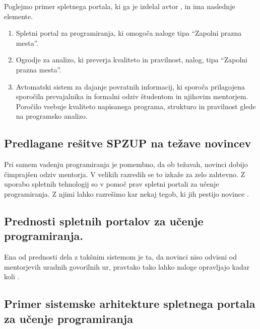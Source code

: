 
Poglejmo primer spletnega portala, ki ga je izdelal avtor
\cite{thesisAWebP}, in ima naslednje elemente.

\begin{enumerate}
\def\labelenumi{\arabic{enumi}.}
\item
  Spletni portal za programiranja, ki omogoča naloge tipa ``Zapolni
  prazna mesta''.
\item
  Ogrodje za analizo, ki preverja kvaliteto in pravilnost, nalog, tipa
  ``Zapolni prazna mesta''.
\item
  Avtomatski sistem za dajanje povratnih informacij, ki sporoča
  prilagojena sporočila prevajalnika in formalni odziv študentom in
  njihovim mentorjem. Poročilo vsebuje kvaliteto napisanega programa,
  strukturo in pravilnost glede na programsko analizo.
\end{enumerate}

\subsection{Predlagane rešitve SPZUP na težave novincev}
\label{predlagane_rešitve_na_težave_novincev}

Pri samem vadenju programiranja je pomembno, da ob težavah, novinci
dobijo čimprajšen odziv mentorja. V velikih razredih se to izkaže za
zelo zahtevno. Z uporabo spletnih tehnologij so v pomoč prav spletni
portali za učenje programiranja. Z njimi lahko razrešimo kar nekaj
tegob, ki jih pestijo novince \cite{thesisAWebP}.

\subsection{Prednosti spletnih portalov za učenje programiranja. }
\label{sec:prednosti_spzup}

Ena od prednosti dela z takšnim sistemom je ta, da novinci niso odvisni
od mentorjevih uradnih govorilnih ur, pravtako tako lahko naloge
opravljajo kadar koli \cite{thesisAWebP}.


\subsection{Primer sistemske arhitekture spletnega portala za učenje
  programiranja}
\label{sec:Primer_aritekture_spletnega_portala}

